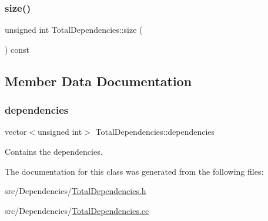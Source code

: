 \subsubsection{\texorpdfstring{size()}{size()}}
{\footnotesize\ttfamily unsigned int Total\+Dependencies\+::size (\begin{DoxyParamCaption}{ }\end{DoxyParamCaption}) const}



\subsection{Member Data Documentation}
\mbox{\label{class_total_dependencies_a94825b4f782c30dfebf69dd2eba0bb1f}} 
\subsubsection{\texorpdfstring{dependencies}{dependencies}}
{\footnotesize\ttfamily vector$<$unsigned int$>$ Total\+Dependencies\+::dependencies\hspace{0.3cm}{\ttfamily [private]}}



Contains the dependencies. 



The documentation for this class was generated from the following files\+:\begin{DoxyCompactItemize}
\item 
src/\+Dependencies/\hyperlink{_total_dependencies_8h}{Total\+Dependencies.\+h}\item 
src/\+Dependencies/\hyperlink{_total_dependencies_8cc}{Total\+Dependencies.\+cc}\end{DoxyCompactItemize}
